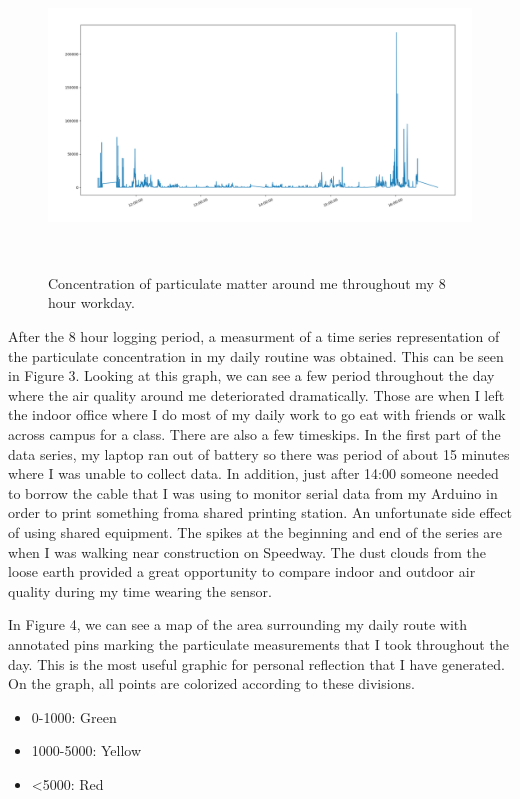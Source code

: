 \documentclass{sigchi}
\begin{document}
\begin{figure}
\centering
  \includegraphics[width=1\columnwidth]{figures/concentration}
  \caption{ Concentration of particulate matter around me throughout my 8 hour workday.
  }~\label{fig:figure3}
\end{figure}

After the 8 hour logging period, a measurment of a time series representation of
the particulate concentration in my daily routine was obtained. This can be seen in Figure 3.
Looking at this graph, we can see a few period throughout the day where the air quality around
me deteriorated dramatically. Those are when I left the indoor office where I do
most of my daily work to go eat with friends or walk across campus for a class.
There are also a few timeskips. In the first part of the data series, my laptop
ran out of battery so there was period of about 15 minutes where I was unable to collect data.
In addition, just after 14:00 someone needed to borrow the cable that I was using
to monitor serial data from my Arduino in order to print something froma shared
printing station. An unfortunate side effect of using shared equipment.
The spikes at the beginning and end of the series are when I was walking near construction
on Speedway. The dust clouds from the loose earth provided a great opportunity to compare
indoor and outdoor air quality during my time wearing the sensor.

In Figure 4, we can see a map of the area surrounding my daily route with annotated pins
marking the particulate measurements that I took throughout the day. This is the most
useful graphic for personal reflection that I have generated. On the graph, all points
are colorized according to these divisions.

\begin{itemize}
\item 0-1000: Green
\item 1000-5000: Yellow
\item <5000: Red
\end{itemize}
\end{document}
